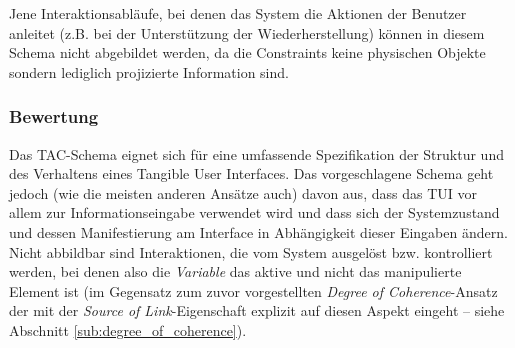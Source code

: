 
Jene Interaktionsabläufe, bei denen das System die Aktionen der Benutzer anleitet (z.B. bei der Unterstützung der Wiederherstellung) können in diesem Schema nicht abgebildet werden, da die Constraints keine physischen Objekte sondern lediglich projizierte Information sind.

\subsubsection{Bewertung}

Das \gls{TAC}-Schema eignet sich für eine umfassende Spezifikation der Struktur und des Verhaltens eines Tangible User Interfaces. Das vorgeschlagene Schema geht jedoch (wie die meisten anderen Ansätze auch) davon aus, dass das \gls{TUI} vor allem zur Informationseingabe verwendet wird und dass sich der Systemzustand und dessen Manifestierung am Interface in Abhängigkeit dieser Eingaben ändern. Nicht abbildbar sind Interaktionen, die vom System ausgelöst bzw. kontrolliert werden, bei denen also die \emph{Variable} das aktive und nicht das manipulierte Element ist (im Gegensatz zum zuvor vorgestellten \emph{Degree of Coherence}-Ansatz der mit der \emph{Source of Link}-Eigenschaft explizit auf diesen Aspekt eingeht -- siehe Abschnitt \ref{sub:degree_of_coherence}).

